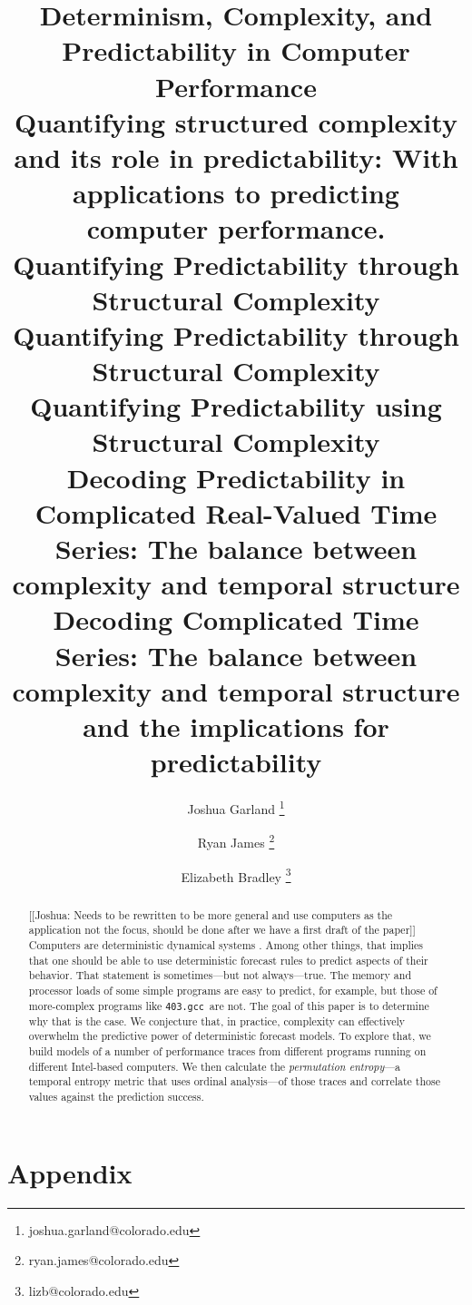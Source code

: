 \documentclass{article}
\title{Determinism, Complexity, and Predictability in Computer Performance\\
Quantifying structured complexity and its role in predictability: With applications to predicting computer performance.
\\ Quantifying Predictability through Structural Complexity \\
{\color{green}Quantifying Predictability through Structural Complexity} 
\\ Quantifying Predictability using Structural Complexity 
\\Decoding Predictability in Complicated Real-Valued Time Series: The balance between complexity and temporal structure
\\Decoding Complicated Time Series: The balance between complexity and temporal structure and the implications for predictability
}
\author[1]{Joshua Garland \thanks{joshua.garland@colorado.edu}}
\author[1]{Ryan James \thanks{ryan.james@colorado.edu}}
\author[1,2]{Elizabeth Bradley \thanks{lizb@colorado.edu}}
\affil[1]{Department of Computer Science\\
  University of Colorado at Boulder\\
  Colorado, USA
}
\affil[2]{Santa Fe Institute\\
  New Mexico, USA
}
\newcommand{\gcc}{{\tt 403.gcc}~}
\begin{document}
\maketitle





\begin{abstract}
[[Joshua: Needs to be rewritten to be more general and use computers as the application not the focus, should be done after we have a first draft of the paper]]  Computers are deterministic dynamical systems \cite{mytkowicz09}.
  Among other things, that implies that one should be able to use
  deterministic forecast rules to predict aspects of their behavior.
  That statement is sometimes---but not always---true. The memory and
  processor loads of some simple programs are easy to predict, for
  example, but those of more-complex programs like \gcc are not.
  The goal of this paper is to determine why that is the case. We
  conjecture that, in practice, complexity can effectively overwhelm
  the predictive power of deterministic forecast models. To explore
  that, we build models of a number of performance traces from
  different programs running on different Intel-based computers. We
  then calculate the \emph{permutation entropy}---a temporal entropy
  metric that uses ordinal analysis---of those traces and correlate
  those values against the prediction success.
\end{abstract}















\section{Appendix}
\end{document}
